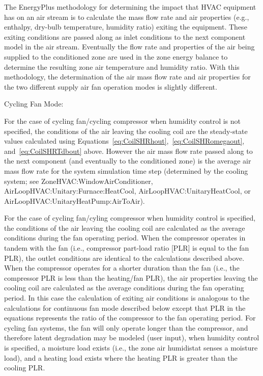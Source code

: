 The EnergyPlus methodology for determining the impact that HVAC equipment has on an air stream is to calculate the mass flow rate and air properties (e.g., enthalpy, dry-bulb temperature, humidity ratio) exiting the equipment. These exiting conditions are passed along as inlet conditions to the next component model in the air stream. Eventually the flow rate and properties of the air being supplied to the conditioned zone are used in the zone energy balance to determine the resulting zone air temperature and humidity ratio. With this methodology, the determination of the air mass flow rate and air properties for the two different supply air fan operation modes is slightly different.

Cycling Fan Mode:

For the case of cycling fan/cycling compressor when humidity control is not specified, the conditions of the air leaving the cooling coil are the steady-state values calculated using Equations~\ref{eq:CoilSHRhout},~\ref{eq:CoilSHRomegaout}, and~\ref{eq:CoilSHRTdbout} above. However the air mass flow rate passed along to the next component (and eventually to the conditioned zone) is the average air mass flow rate for the system simulation time step (determined by the cooling system; see ZoneHVAC:WindowAirConditioner, AirLoopHVAC:Unitary:Furnace:HeatCool, AirLoopHVAC:UnitaryHeatCool, or AirLoopHVAC:UnitaryHeatPump:AirToAir).

For the case of cycling fan/cyling compressor when humidity control is specified, the conditions of the air leaving the cooling coil are calculated as the average conditions during the fan operating period. When the compressor operates in tandem with the fan (i.e., compressor part-load ratio {[}PLR{]} is equal to the fan PLR), the outlet conditions are identical to the calculations described above. When the compressor operates for a shorter duration than the fan (i.e., the compressor PLR is less than the heating/fan PLR), the air properties leaving the cooling coil are calculated as the average conditions during the fan operating period. In this case the calculation of exiting air conditions is analogous to the calculations for continuous fan mode described below except that PLR in the equations represents the ratio of the compressor to the fan operating period. For cycling fan systems, the fan will only operate longer than the compressor, and therefore latent degradation may be modeled (user input), when humidity control is specified, a moisture load exists (i.e., the zone air humidistat senses a moisture load), and a heating load exists where the heating PLR is greater than the cooling PLR.


